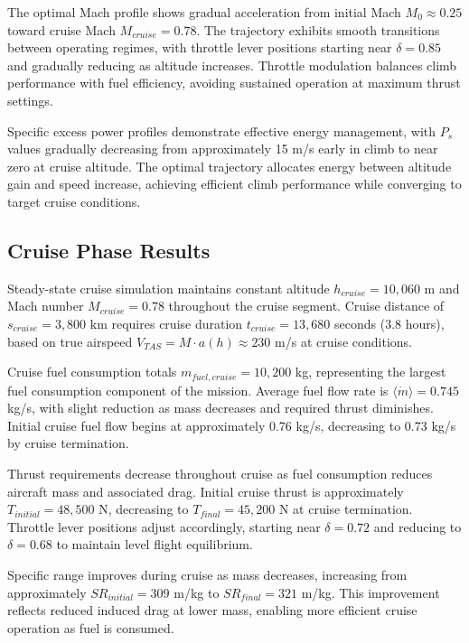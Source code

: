 The optimal Mach profile shows gradual acceleration from initial Mach $M_0 \approx 0.25$ toward cruise Mach $M_{cruise} = 0.78$. The trajectory exhibits smooth transitions between operating regimes, with throttle lever positions starting near $\delta = 0.85$ and gradually reducing as altitude increases. Throttle modulation balances climb performance with fuel efficiency, avoiding sustained operation at maximum thrust settings.

Specific excess power profiles demonstrate effective energy management, with $P_s$ values gradually decreasing from approximately 15 m/s early in climb to near zero at cruise altitude. The optimal trajectory allocates energy between altitude gain and speed increase, achieving efficient climb performance while converging to target cruise conditions.

\subsection{Cruise Phase Results}

Steady-state cruise simulation maintains constant altitude $h_{cruise} = 10,060$ m and Mach number $M_{cruise} = 0.78$ throughout the cruise segment. Cruise distance of $s_{cruise} = 3,800$ km requires cruise duration $t_{cruise} = 13,680$ seconds (3.8 hours), based on true airspeed $V_{TAS} = M \cdot a(h) \approx 230$ m/s at cruise conditions.

Cruise fuel consumption totals $m_{fuel,cruise} = 10,200$ kg, representing the largest fuel consumption component of the mission. Average fuel flow rate is $\langle \dot{m} \rangle = 0.745$ kg/s, with slight reduction as mass decreases and required thrust diminishes. Initial cruise fuel flow begins at approximately 0.76 kg/s, decreasing to 0.73 kg/s by cruise termination.

Thrust requirements decrease throughout cruise as fuel consumption reduces aircraft mass and associated drag. Initial cruise thrust is approximately $T_{initial} = 48,500$ N, decreasing to $T_{final} = 45,200$ N at cruise termination. Throttle lever positions adjust accordingly, starting near $\delta = 0.72$ and reducing to $\delta = 0.68$ to maintain level flight equilibrium.

Specific range improves during cruise as mass decreases, increasing from approximately $SR_{initial} = 309$ m/kg to $SR_{final} = 321$ m/kg. This improvement reflects reduced induced drag at lower mass, enabling more efficient cruise operation as fuel is consumed.

